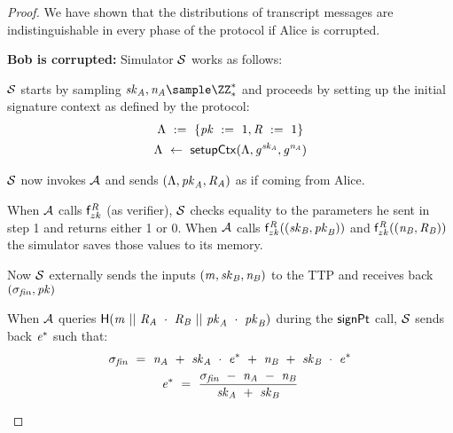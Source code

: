 \begin{proof}
    We have shown that the distributions of transcript messages are indistinguishable in every phase of the protocol if Alice is corrupted.

    \textbf{Bob is corrupted: } Simulator $\mathcal{S}$ works as follows:
    \begin{asparaenum}
        \item $\mathcal{S}$ starts by sampling $\varSecKeyAlice, \varNonceAlice \sample \cnstIntegersPrimeWithoutZero{*}$ and proceeds by setting up the initial signature context as defined by the protocol:
        \begin{gather*}
            \Lambda ~:=~ \{ \mathit{pk} ~:=~ 1, \mathit{R} ~:=~ 1 \} \\
            \Lambda ~\leftarrow~ \mathsf{setupCtx}( \Lambda, \mathit{g}^{\mathit{sk}_{\mathit{A}}}, \mathit{g}^{\mathit{\mathit{n}_{\mathit{A}}}} ) \\
        \end{gather*}
        \item $\mathcal{S}$ now invokes $\mathcal{A}$ and sends $(\Lambda, \mathit{pk}_{\mathit{A}}, \mathit{R}_{\mathit{A}})$ as if coming from Alice.
        \item When $\mathcal{A}$ calls $\mathsf{f}^{\mathit{R}}_{zk}$ (as verifier), $\mathcal{S}$ checks equality to the parameters he sent in step 1 and returns either 1 or 0.
        When $\mathcal{A}$ calls $\mathsf{f}^{\mathit{R}}_{zk}((\mathit{sk}_{\mathit{B}}, \mathit{pk}_{\mathit{B}}))$ and $\mathsf{f}^{\mathit{R}}_{zk}((\mathit{\mathit{n}_{\mathit{B}}}, \mathit{R}_{\mathit{B}}))$ the simulator saves those values to its memory.
        \item Now $\mathcal{S}$ externally sends the inputs $(\mathit{m}, \mathit{sk}_{\mathit{B}}, \mathit{\mathit{n}_{\mathit{B}}})$ to the TTP and receives back $(\sigma_{\mathit{fin}}, \mathit{pk})$
        \item When $\mathcal{A}$ queries $\mathsf{H} (\mathit{m} ~||~ \mathit{R}_{\mathit{A}} ~\cdot~ \mathit{R}_{\mathit{B}} ~||~ \mathit{pk}_{\mathit{A}} ~\cdot~ \mathit{pk}_{\mathit{B}})$ during the $\mathsf{signPt}$ call, $\mathcal{S}$ sends back $\mathit{e}^*$ such that:
        \begin{gather*}
            \sigma_{\mathit{fin}} ~=~ \mathit{\mathit{n}_{\mathit{A}}} ~+~ \mathit{sk}_{\mathit{A}} ~\cdot~ \mathit{e}^* ~+~ \mathit{\mathit{n}_{\mathit{B}}} ~+~ \mathit{sk}_{\mathit{B}} ~\cdot~ \mathit{e}^* \\
            \mathit{e}^* ~=~ \frac{\sigma_{\mathit{fin}} ~-~ \mathit{\mathit{n}_{\mathit{A}}} ~-~ \mathit{\mathit{n}_{\mathit{B}}}}{\mathit{sk}_{\mathit{A}} ~+~ \mathit{sk}_{\mathit{B}}}
        \end{gather*}

\end{asparaenum}
\end{proof}
